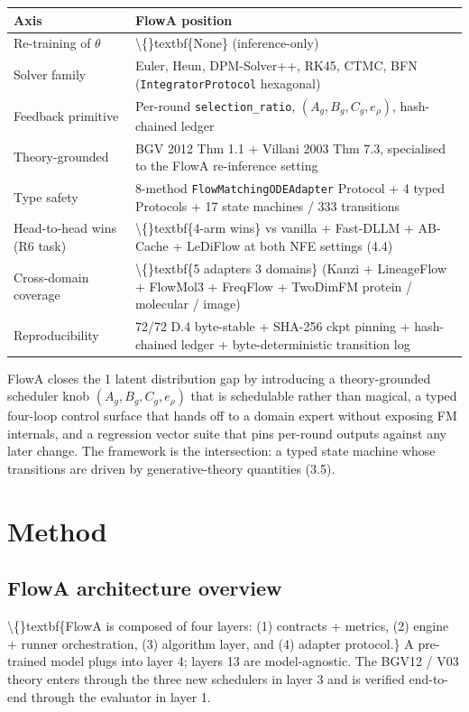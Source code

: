 \documentclass[preprint,3p,times,twocolumn]{elsarticle}
\begin{document}
\begin{table}[ht]
\centering
\small
\begin{tabular}{ll}
\hline
\textbf{Axis} & \textbf{FlowA position} \\
\hline
Re-training of $\theta$ & \textbackslash\{\}textbf\{None\} (inference-only) \\
Solver family & Euler, Heun, DPM-Solver++, RK45, CTMC, BFN (\texttt{IntegratorProtocol} hexagonal) \\
Feedback primitive & Per-round \texttt{selection\_ratio}, $(A_g, B_g, C_g, e_\rho)$, hash-chained ledger \\
Theory-grounded & BGV 2012 Thm 1.1 + Villani 2003 Thm 7.3, specialised to the FlowA re-inference setting \\
Type safety & 8-method \texttt{FlowMatchingODEAdapter} Protocol + 4 typed Protocols + 17 state machines / 333 transitions \\
Head-to-head wins (R6 task) & \textbackslash\{\}textbf\{4-arm wins\} vs vanilla + Fast-DLLM + AB-Cache + LeDiFlow at both NFE settings (4.4) \\
Cross-domain coverage & \textbackslash\{\}textbf\{5 adapters  3 domains\} (Kanzi + LineageFlow + FlowMol3 + FreqFlow + TwoDimFM  protein / molecular / image) \\
Reproducibility & 72/72 D.4 byte-stable + SHA-256 ckpt pinning + hash-chained ledger + byte-deterministic transition log \\
\hline
\end{tabular}
\end{table}

FlowA closes the 1 latent distribution gap by introducing a theory-grounded scheduler knob $(A_g, B_g, C_g, e_\rho)$ that is schedulable rather than magical, a typed four-loop control surface that hands off to a domain expert without exposing FM internals, and a regression vector suite that pins per-round outputs against any later change. The framework is the intersection: a typed state machine whose transitions are driven by generative-theory quantities (3.5).

\section{Method}
\subsection{FlowA architecture overview}
\textbackslash\{\}textbf\{FlowA is composed of four layers: (1) contracts + metrics, (2) engine + runner orchestration, (3) algorithm layer, and (4) adapter protocol.\} A pre-trained model plugs into layer 4; layers 13 are model-agnostic. The BGV12 / V03 theory enters through the three new schedulers in layer 3 and is verified end-to-end through the evaluator in layer 1.
\end{document}

